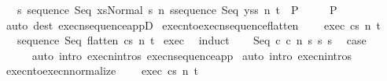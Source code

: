 \begin{isabellebody}
\ \ \ {\isasymAnd}s{\isacharprime}{\isachardot}\ {\isasymlbrakk}{\isasymGamma}{\isasymturnstile}{\isasymlangle}sequence\ Seq\ xs{\isacharcomma}Normal\ s{\isasymrangle}\ {\isacharequal}n{\isasymRightarrow}\ s{\isacharprime}{\isacharsemicolon}{\isasymGamma}{\isasymturnstile}{\isasymlangle}sequence\ Seq\ ys{\isacharcomma}s{\isacharprime}{\isasymrangle}\ {\isacharequal}n{\isasymRightarrow}\ t{\isasymrbrakk}\ {\isasymLongrightarrow}\ P\isanewline
\ \ \ {\isasymrbrakk}\ {\isasymLongrightarrow}\ P{\isachardoublequoteclose}\isanewline
%
\isadelimproof
\ \ %
\endisadelimproof
%
\isatagproof
{}\isamarkupfalse%
\ {\isacharparenleft}auto\ dest{\isacharcolon}\ execn{\isacharunderscore}sequence{\isacharunderscore}appD{\isacharparenright}%
\endisatagproof
{\isafoldproof}%
%
\isadelimproof
\isanewline
%
\endisadelimproof
\isanewline
{}\isamarkupfalse%
\ execn{\isacharunderscore}to{\isacharunderscore}execn{\isacharunderscore}sequence{\isacharunderscore}flatten{\isacharcolon}\ \isanewline
\ \ \ exec{\isacharcolon}\ {\isachardoublequoteopen}{\isasymGamma}{\isasymturnstile}{\isasymlangle}c{\isacharcomma}s{\isasymrangle}\ {\isacharequal}n{\isasymRightarrow}\ t{\isachardoublequoteclose}\isanewline
\ \ \ {\isachardoublequoteopen}{\isasymGamma}{\isasymturnstile}{\isasymlangle}sequence\ Seq\ {\isacharparenleft}flatten\ c{\isacharparenright}{\isacharcomma}s{\isasymrangle}\ {\isacharequal}n{\isasymRightarrow}\ t{\isachardoublequoteclose}\isanewline
%
\isadelimproof
%
\endisadelimproof
%
\isatagproof
{}\isamarkupfalse%
\ exec\ \isanewline
{}\isamarkupfalse%
\ induct\isanewline
\ \ \isamarkupfalse%
\ {\isacharparenleft}Seq\ c{}\ c{}\ n\ s\ s{\isacharprime}\ s{\isacharprime}{\isacharprime}{\isacharparenright}\ \isamarkupfalse%
\ {\isacharquery}case\ \isanewline
\ \ \ \ \isamarkupfalse%
\ {\isacharparenleft}auto\ intro{\isacharcolon}\ execn{\isachardot}intros\ execn{\isacharunderscore}sequence{\isacharunderscore}app{\isacharparenright}\isanewline
{}\isamarkupfalse%
\ {\isacharparenleft}auto\ intro{\isacharcolon}\ execn{\isachardot}intros{\isacharparenright}%
\endisatagproof
{\isafoldproof}%
%
\isadelimproof
\isanewline
%
\endisadelimproof
\isanewline
{}\isamarkupfalse%
\ execn{\isacharunderscore}to{\isacharunderscore}execn{\isacharunderscore}normalize{\isacharcolon}\ \isanewline
\ \ \ exec{\isacharcolon}\ {\isachardoublequoteopen}{\isasymGamma}{\isasymturnstile}{\isasymlangle}c{\isacharcomma}s{\isasymrangle}\ {\isacharequal}n{\isasymRightarrow}\ t{\isachardoublequoteclose}\isanewline

\end{isabellebody}
